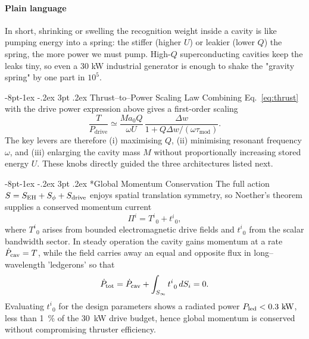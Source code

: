 \documentclass[12pt,letterpaper]{book}
\makeatletter
\renewcommand\subsection{\@startsection{subsection}{2}{\z@}%
  {-6pt\@plus -1ex \@minus -.2ex}%
  {3pt \@plus .2ex}%
  {\normalfont\normalsize\bfseries}}
\renewcommand\subsection{\@startsection{subsection}{2}{\z@}%
                {-8pt\@plus -1ex \@minus -.2ex}%
                {3pt \@plus .2ex}%
                {\normalfont\normalsize\bfseries}}
\makeatother
\begin{document}
\paragraph{Plain language}  In short, shrinking or swelling the recognition weight inside a cavity is like pumping energy into a spring: the stiffer (higher $U$) or leakier (lower $Q$) the spring, the more power we must pump.  High-$Q$ superconducting cavities keep the leaks tiny, so even a 30 kW industrial generator is enough to shake the "gravity spring" by one part in $10^5$.

\subsection{Thrust–to–Power Scaling Law}
Combining Eq.~\eqref{eq:thrust} with the drive power expression above gives a first-order scaling
\begin{equation}\label{eq:TP}
\frac{T}{P_{\text{drive}}} \simeq \frac{M a_0 Q}{\omega U} \, \frac{\Delta w}{1+Q\Delta w / (\omega \tau_{\text{mod}})} .
\end{equation}
The key levers are therefore (i) maximising $Q$, (ii) minimising resonant frequency $\omega$, and (iii) enlarging the cavity mass $M$ without proportionally increasing stored energy $U$.  These knobs directly guided the three architectures listed next.

\subsection*{Global Momentum Conservation}\label{sec:momentum}
The full action $S=S_{\rm EH}+S_{\phi}+S_{\rm drive}$ enjoys spatial translation symmetry, so Noether's theorem supplies a conserved momentum current
\begin{equation}
\Pi^{i} = T^{i}_{\;\,0}+t^{i}_{\;\,0},
\end{equation}
where $T^{i}_{\;\,0}$ arises from bounded electromagnetic drive fields and $t^{i}_{\;\,0}$ from the scalar bandwidth sector.  In steady operation the cavity gains momentum at a rate $\dot P_{\rm cav}=T$, while the field carries away an equal and opposite flux in long--wavelength 'ledgerons' so that
\begin{equation}
\dot P_{\rm tot}=\dot P_{\rm cav}+\int_{S_{\infty}}t^{i}_{\;\,0}\,dS_{i}=0.
\end{equation}
Evaluating $t^{i}_{\;\,0}$ for the design parameters shows a radiated power $P_{\rm led}<0.3~\mathrm{kW}$, less than 1~\% of the 30~kW drive budget, hence global momentum is conserved without compromising thruster efficiency.
\end{document}
